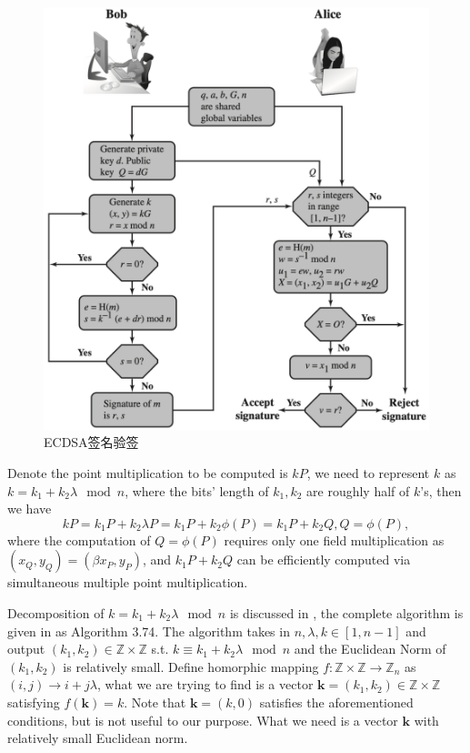 \documentclass{article}
\newcommand{\Z}{\mathbb{Z}}
\begin{document}
\begin{figure}[h]
\centering
\includegraphics[width=.8\textwidth]{ecdsa.png}
\caption{ECDSA签名验签}\label{fig-ecdsa}
\end{figure}

Denote the point multiplication to be computed is $kP$,
we need to represent $k$ as $k=k_1+k_2\lambda \mod n$, 
where the bits' length of $k_1, k_2$ are roughly half of $k$'s, then we have
$$kP = k_1P + k_2\lambda P = k_1P + k_2\phi(P) = k_1 P + k_2 Q, Q = \phi(P),$$
where the computation of $Q=\phi(P)$ requires only one field multiplication as $(x_Q, y_Q) = (\beta x_P, y_P)$,
and $k_1 P + k_2 Q$ can be efficiently computed via simultaneous multiple point multiplication.

Decomposition of $k = k_1+k_2\lambda \mod n$ is discussed in \cite{glv01}, 
the complete algorithm is given in \cite{guidetoecc} as Algorithm 3.74.
The algorithm takes in $n, \lambda, k\in [1, n-1]$ and output $(k_1, k_2) \in \Z \times \Z$ s.t.  
$k \equiv k_1 + k_2 \lambda \mod n$ and the Euclidean Norm of $(k_1, k_2)$ is relatively small.
Define homorphic mapping $f: \Z\times\Z \rightarrow \Z_n$ as $(i,j) \rightarrow i + j\lambda$,
what we are trying to find is a vector $\mathbf{k}=(k_1, k_2)\in \Z\times\Z$ satisfying $f(\mathbf{k})= k$.
Note that $\mathbf{k} = (k, 0)$ satisfies the aforementioned conditions, but is not useful to our purpose.
What we need is a vector $\mathbf{k}$ with relatively small Euclidean norm.
\end{document}
